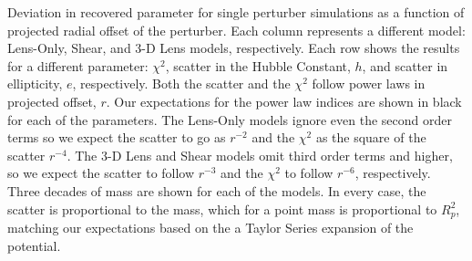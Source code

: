 \label{fig:toyr3} Deviation in recovered parameter for single perturber simulations as a function of projected radial offset of the perturber. Each column represents a different model: Lens-Only, Shear, and 3-D Lens models, respectively. Each row shows the results for a different parameter: $\chi^2$, scatter in the Hubble Constant, $h$, and scatter in ellipticity, $e$, respectively. Both the scatter and the $\chi^2$ follow power laws in projected offset, $r$. Our expectations for the power law indices are shown in black for each of the parameters. The Lens-Only models ignore even the second order terms so we expect the scatter to go as $r^{-2}$ and the $\chi^2$ as the square of the scatter $r^{-4}$. The 3-D Lens and Shear models omit third order terms and higher, so we expect the scatter to follow $r^{-3}$ and the $\chi^2$ to follow $r^{-6}$, respectively. Three decades of mass are shown for each of the models. In every case, the scatter is proportional to the mass, which for a point mass is proportional to $R_p^2$, matching our expectations based on the a Taylor Series expansion of the potential.